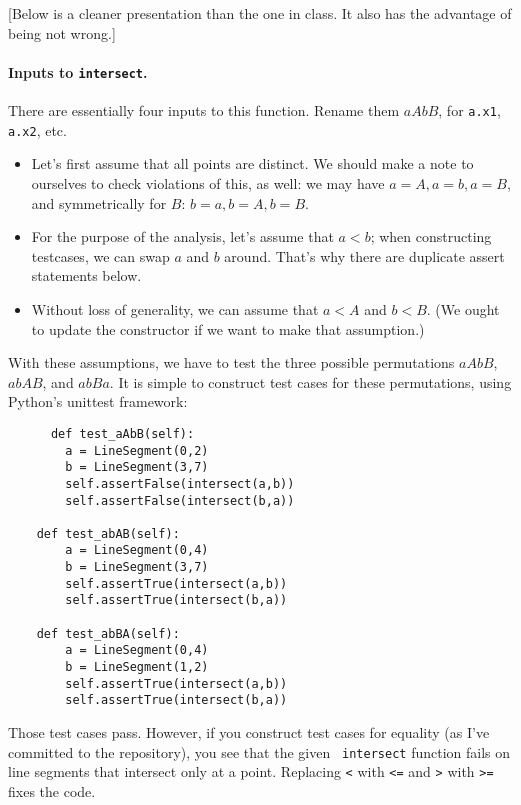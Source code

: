 \documentclass[11pt]{article}
\begin{document}
[Below is a cleaner presentation than the one in class. It also
has the advantage of being not wrong.]

\paragraph{Inputs to {\tt intersect}.} There are essentially
four inputs to this function. Rename them $aAbB$, for {\tt a.x1},
{\tt a.x2}, etc.
\begin{itemize}
\item Let's first assume that all points are distinct. We should
  make a note to ourselves to check violations of this, as well:
  we may have $a = A, a = b, a = B$, and symmetrically for $B$:
  $b = a, b = A, b = B$.
  \item For the purpose of the analysis, let's assume that $a < b$;
    when constructing testcases, we can swap $a$ and $b$ around.
    That's why there are duplicate assert statements below.
  \item Without loss of generality, we can assume that
$a < A$ and $b < B$. (We ought to update the constructor if we
    want to make that assumption.) 
\end{itemize}
With these assumptions, we have to test the three possible permutations
$aAbB$, $abAB$, and $abBa$. It is simple to construct test cases
for these permutations, using Python's unittest framework:
\begin{lstlisting}
      def test_aAbB(self):
        a = LineSegment(0,2)
        b = LineSegment(3,7)
        self.assertFalse(intersect(a,b))
        self.assertFalse(intersect(b,a))

    def test_abAB(self):
        a = LineSegment(0,4)
        b = LineSegment(3,7)
        self.assertTrue(intersect(a,b))
        self.assertTrue(intersect(b,a))

    def test_abBA(self):
        a = LineSegment(0,4)
        b = LineSegment(1,2)
        self.assertTrue(intersect(a,b))
        self.assertTrue(intersect(b,a))
\end{lstlisting}
Those test cases pass. However, if you construct test cases for
equality (as I've committed to the repository), you see that the given {\tt
  intersect} function fails on line segments that intersect only at a
point. Replacing \verb+<+ with \verb+<=+ and \verb+>+ with \verb+>=+
fixes the code.
\end{document}
